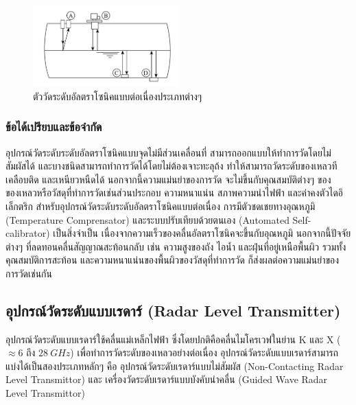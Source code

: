 \documentclass[final,11pt]{article}
\begin{document}
\begin{figure}[H]
    \centering
    \includegraphics[width=0.5\textwidth]{images/Screenshot_26.jpg}
    \caption{ตัววัดระดับอัลตราโซนิคแบบต่อเนื่องประเภทต่างๆ}
    \label{fig:ulc}
\end{figure}

\subsubsection{ข้อได้เปรียบและข้อจำกัด}
อุปกรณ์วัดระดับระดับอัลตราโซนิคแบบจุดไม่มีส่วนเคลื่อนที่ สามารถออกแบบให้ทำการวัดโดยไม่สัมผัสได้ และบางชนิดสามารถทำการวัดได้โดยไม่ต้องเจาะทะลุถ้ง 
ทำให้สามารถวัดระดับของเหลวทีเคลือบติด และเหนียวหนืดได้ นอกจากนี้ความแม่นยำของการวัด จะไม่ขึ้นกับคุณสมบัติต่างๆ 
ของของเหลวหรือวัสดุที่ทำการวัดเช่นส่วนประกอบ ความหนาแน่น สภาพความนำไฟฟ้า และค่าคงตัวไดอิเล็กตริก
สำหรับอุปกรณ์วัดระดับระดับอัลตราโซนิคแบบต่อเนื่อง การมีตัวชดเชยทางอุณหภูมิ (Temperature Comprensator) และระบบปรับเทียบด้วยตนเอง 
(Automated Self-calibrator) เป็นสิ่งจำเป็น เนื่องจากความเร็วของคลื่นอัลตราโซนิคจะขึ้นกับอุณหภูมิ นอกจากนี้ปัจจัยต่างๆ ที่ลดทอนคลื่นสัญญาณสะท้อนกลับ
เช่น ความสูงของถัง ไอน้ำ และฝุ่นที่อยู่เหนือพื้นผิว รวมทั้งคุณสมบัติการสะท้อน และความหนาแน่นของพื้นผิวของวัสดุที่ทำการวัด ก็ส่งผลต่อความแม่นยำของการวัดเช่นกัน

\subsection{อุปกรณ์วัดระดับแบบเรดาร์ (Radar Level Transmitter)}
อุปกรณ์วัดระดับแบบเรดาร์ใช้คลื่นแม่เหล็กไฟฟ้า ซึ่งโดยปกติคือคลื่นไมโครเวฟในย่าน K และ X ($\approx 6$ ถึง $\SI{28}{GHz}$) 
เพื่อทำการวัดระดับของเหลวอย่างต่อเนื่อง อุปกรณ์วัดระดับแบบเรดาร์สามารถแบ่งได้เป็นสองประเภทหลักๆ คือ อุปกรณ์วัดระดับเรดาร์แบบไม่สัมผัส
(Non-Contacting Radar Level Transmittor) และ เครื่องวัดระดับเรดาร์แบบบังคับนำคลื่น (Guided Wave Radar Level Transmittor) 
\end{document}
